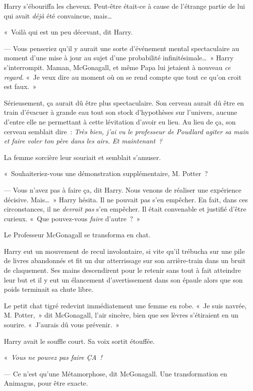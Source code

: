 Harry s'ébouriffa les cheveux. Peut-être était-ce à cause de l'étrange partie de lui qui avait \emph{déjà} été convaincue, mais…

«~Voilà qui est un peu décevant, dit Harry.

--- Vous penseriez qu'il y aurait une sorte d'événement mental spectaculaire au moment d'une mise à jour au sujet d'une probabilité infinitésimale…~» Harry s'interrompit. Maman, McGonagall, et même Papa lui jetaient à nouveau \emph{ce regard}. «~Je veux dire au moment où on se rend compte que tout ce qu'on croit est faux.~»

Sérieusement, ça aurait dû être plus spectaculaire. Son cerveau aurait dû être en train d'évacuer à grande eau tout son stock d'hypothèses sur l'univers, aucune d'entre elle ne permettant à cette lévitation d'avoir eu lieu. Au lieu de ça, son cerveau semblait dire~: \emph{Très bien, j'ai vu le professeur de Poudlard agiter sa main et faire voler ton père dans les airs. Et maintenant~?}

La femme sorcière leur souriait et semblait s'amuser.

«~Souhaiteriez-vous une démonstration supplémentaire, M. Potter~?

--- Vous n'avez pas à faire ça, dit Harry. Nous venons de réaliser une expérience décisive. Mais…~» Harry hésita. Il ne pouvait pas s'en empêcher. En fait, dans ces circonstances, il ne \emph{devrait pas} s'en empêcher. Il était convenable et justifié d'être curieux. «~Que pouvez-vous \emph{faire} d'autre~?~»

Le Professeur McGonagall se transforma en chat.

Harry eut un mouvement de recul involontaire, si vite qu'il trébucha sur une pile de livres abandonnés et fit un dur atterrissage sur son arrière-train dans un bruit de claquement. Ses mains descendirent pour le retenir sans tout à fait atteindre leur but et il y eut un élancement d'avertissement dans son épaule alors que son poids terminait sa chute libre.

Le petit chat tigré redevint immédiatement une femme en robe. «~Je suis navrée, M. Potter,~» dit McGonagall, l'air sincère, bien que ses lèvres s'étiraient en un sourire. «~J'aurais dû vous prévenir.~»

Harry avait le souffle court. Sa voix sortit étouffée.

«~\emph{Vous ne pouvez pas faire ÇA~!}

--- Ce n'est qu'une Métamorphose, dit McGonagall. Une transformation en Animagus, pour être exacte.

